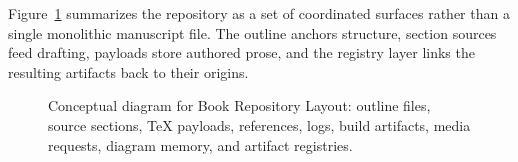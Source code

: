 Figure~\ref{fig:ch03_sec03_repository_layout} summarizes the repository as a set of coordinated surfaces rather than a single monolithic manuscript file. The outline anchors structure, section sources feed drafting, payloads store authored prose, and the registry layer links the resulting artifacts back to their origins.

\begin{figure}[htbp]
\centering

\caption{Conceptual diagram for Book Repository Layout: outline files, source sections, \TeX{} payloads, references, logs, build artifacts, media requests, diagram memory, and artifact registries.}
\label{fig:ch03_sec03_repository_layout}
\end{figure}
